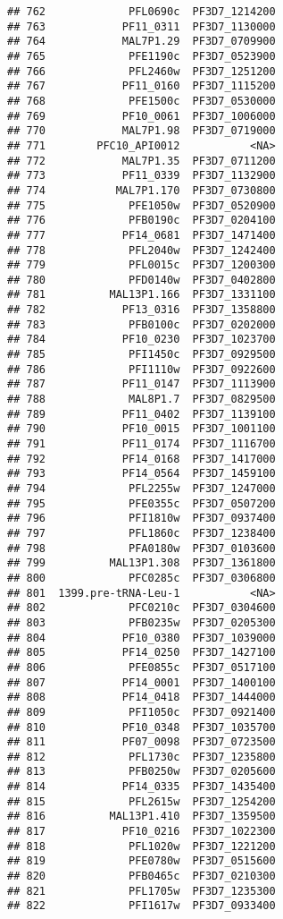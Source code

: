 \documentclass[12pt, a4paper]{article}\usepackage[]{graphicx}\usepackage[]{color}
\makeatletter
\newenvironment{kframe}{%
 \def\at@end@of@kframe{}%
 \ifinner\ifhmode%
  \def\at@end@of@kframe{\end{minipage}}%
  \begin{minipage}{\columnwidth}%
 \fi\fi%
 \def\FrameCommand##1{\hskip\@totalleftmargin \hskip-\fboxsep
 \colorbox{shadecolor}{##1}\hskip-\fboxsep
     \hskip-\linewidth \hskip-\@totalleftmargin \hskip\columnwidth}%
 \MakeFramed {\advance\hsize-\width
   \@totalleftmargin\z@ \linewidth\hsize
   \@setminipage}}%
 {\par\unskip\endMakeFramed%
 \at@end@of@kframe}
\newenvironment{knitrout}{}{} %
\makeatother
\begin{document}
\begin{knitrout}
\begin{kframe}
\begin{verbatim}
## 762             PFL0690c  PF3D7_1214200
## 763            PF11_0311  PF3D7_1130000
## 764            MAL7P1.29  PF3D7_0709900
## 765             PFE1190c  PF3D7_0523900
## 766             PFL2460w  PF3D7_1251200
## 767            PF11_0160  PF3D7_1115200
## 768             PFE1500c  PF3D7_0530000
## 769            PF10_0061  PF3D7_1006000
## 770            MAL7P1.98  PF3D7_0719000
## 771        PFC10_API0012           <NA>
## 772            MAL7P1.35  PF3D7_0711200
## 773            PF11_0339  PF3D7_1132900
## 774           MAL7P1.170  PF3D7_0730800
## 775             PFE1050w  PF3D7_0520900
## 776             PFB0190c  PF3D7_0204100
## 777            PF14_0681  PF3D7_1471400
## 778             PFL2040w  PF3D7_1242400
## 779             PFL0015c  PF3D7_1200300
## 780             PFD0140w  PF3D7_0402800
## 781          MAL13P1.166  PF3D7_1331100
## 782            PF13_0316  PF3D7_1358800
## 783             PFB0100c  PF3D7_0202000
## 784            PF10_0230  PF3D7_1023700
## 785             PFI1450c  PF3D7_0929500
## 786             PFI1110w  PF3D7_0922600
## 787            PF11_0147  PF3D7_1113900
## 788             MAL8P1.7  PF3D7_0829500
## 789            PF11_0402  PF3D7_1139100
## 790            PF10_0015  PF3D7_1001100
## 791            PF11_0174  PF3D7_1116700
## 792            PF14_0168  PF3D7_1417000
## 793            PF14_0564  PF3D7_1459100
## 794             PFL2255w  PF3D7_1247000
## 795             PFE0355c  PF3D7_0507200
## 796             PFI1810w  PF3D7_0937400
## 797             PFL1860c  PF3D7_1238400
## 798             PFA0180w  PF3D7_0103600
## 799          MAL13P1.308  PF3D7_1361800
## 800             PFC0285c  PF3D7_0306800
## 801  1399.pre-tRNA-Leu-1           <NA>
## 802             PFC0210c  PF3D7_0304600
## 803             PFB0235w  PF3D7_0205300
## 804            PF10_0380  PF3D7_1039000
## 805            PF14_0250  PF3D7_1427100
## 806             PFE0855c  PF3D7_0517100
## 807            PF14_0001  PF3D7_1400100
## 808            PF14_0418  PF3D7_1444000
## 809             PFI1050c  PF3D7_0921400
## 810            PF10_0348  PF3D7_1035700
## 811            PF07_0098  PF3D7_0723500
## 812             PFL1730c  PF3D7_1235800
## 813             PFB0250w  PF3D7_0205600
## 814            PF14_0335  PF3D7_1435400
## 815             PFL2615w  PF3D7_1254200
## 816          MAL13P1.410  PF3D7_1359500
## 817            PF10_0216  PF3D7_1022300
## 818             PFL1020w  PF3D7_1221200
## 819             PFE0780w  PF3D7_0515600
## 820             PFB0465c  PF3D7_0210300
## 821             PFL1705w  PF3D7_1235300
## 822             PFI1617w  PF3D7_0933400

\end{verbatim}
\end{kframe}
\end{knitrout}
\end{document}

